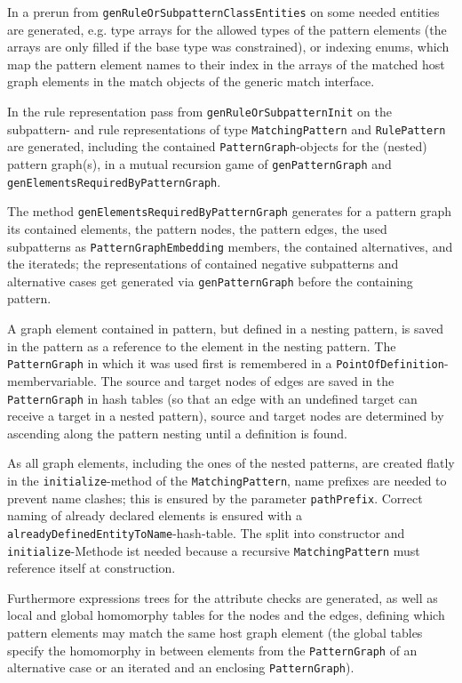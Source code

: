 In a prerun from \texttt{gen\-Rule\-Or\-Subpattern\-Class\-Entities} on some needed entities are generated, e.g. type arrays for the allowed types of the pattern elements (the arrays are only filled if the base type was constrained), or indexing enums, which map the pattern element names to their index in the arrays of the matched host graph elements in the match objects of the generic match interface.

In the rule representation pass from \texttt{gen\-Rule\-Or\-Subpattern\-Init} on the subpattern- and rule representations of type \texttt{Matching\-Pattern} and \texttt{Rule\-Pattern} are generated, including the contained \texttt{Pattern\-Graph}-objects for the (nested) pattern graph(s), in a mutual recursion game of \texttt{gen\-Pattern\-Graph} and \texttt{gen\-Elements\-Required\-By\-Pattern\-Graph}.

The method \texttt{gen\-Elements\-Required\-By\-Pattern\-Graph} generates for a pattern graph its contained elements, the pattern nodes, the pattern edges, the used subpatterns as \texttt{Pattern\-Graph\-Embedding} members, the contained alternatives, and the iterateds; the representations of contained negative subpatterns and alternative cases get generated via \texttt{gen\-Pattern\-Graph} before the containing pattern. 

A graph element contained in pattern, but defined in a nesting pattern, is saved in the pattern as a reference to the element in the nesting pattern. 
The \texttt{Pattern\-Graph} in which it was used first is remembered in a \texttt{Point\-Of\-Definition}-membervariable.
The source and target nodes of edges are saved in the \texttt{Pattern\-Graph} in hash tables (so that an edge with an undefined target can receive a target in a nested pattern), source and target nodes are determined by ascending along the pattern nesting until a definition is found.

As all graph elements, including the ones of the nested patterns, are created flatly in the \texttt{initialize}-method of the \texttt{Matching\-Pattern}, name prefixes are needed to prevent name clashes; this is ensured by the parameter \texttt{path\-Prefix}.
Correct naming of already declared elements is ensured with a \texttt{already\-Defined\-Entity\-To\-Name}-hash-table.
The split into constructor and \texttt{initialize}-Methode ist needed because a recursive \texttt{Matching\-Pattern} must reference itself at construction.

Furthermore expressions trees for the attribute checks are generated, as well as local and global homomorphy tables for the nodes and the edges, defining which pattern elements may match the same host graph element (the global tables specify the homomorphy in between elements from the \texttt{Pattern\-Graph} of an alternative case or an iterated and an enclosing \texttt{Pattern\-Graph}).


